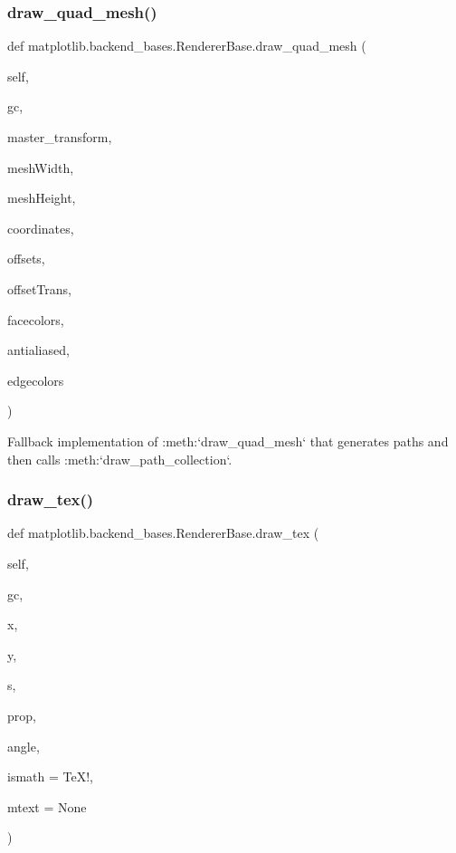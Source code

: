 \subsubsection{\texorpdfstring{draw\+\_\+quad\+\_\+mesh()}{draw\_quad\_mesh()}}
{\footnotesize\ttfamily def matplotlib.\+backend\+\_\+bases.\+Renderer\+Base.\+draw\+\_\+quad\+\_\+mesh (\begin{DoxyParamCaption}\item[{}]{self,  }\item[{}]{gc,  }\item[{}]{master\+\_\+transform,  }\item[{}]{mesh\+Width,  }\item[{}]{mesh\+Height,  }\item[{}]{coordinates,  }\item[{}]{offsets,  }\item[{}]{offset\+Trans,  }\item[{}]{facecolors,  }\item[{}]{antialiased,  }\item[{}]{edgecolors }\end{DoxyParamCaption})}

\begin{DoxyVerb}Fallback implementation of :meth:`draw_quad_mesh` that generates paths
and then calls :meth:`draw_path_collection`.
\end{DoxyVerb}
 \mbox{\label{classmatplotlib_1_1backend__bases_1_1RendererBase_a49c49f45ec1805700539b3d996d8386b}} 
\subsubsection{\texorpdfstring{draw\+\_\+tex()}{draw\_tex()}}
{\footnotesize\ttfamily def matplotlib.\+backend\+\_\+bases.\+Renderer\+Base.\+draw\+\_\+tex (\begin{DoxyParamCaption}\item[{}]{self,  }\item[{}]{gc,  }\item[{}]{x,  }\item[{}]{y,  }\item[{}]{s,  }\item[{}]{prop,  }\item[{}]{angle,  }\item[{}]{ismath = {\ttfamily \textquotesingle{}TeX!\textquotesingle{}},  }\item[{}]{mtext = {\ttfamily None} }\end{DoxyParamCaption})}

